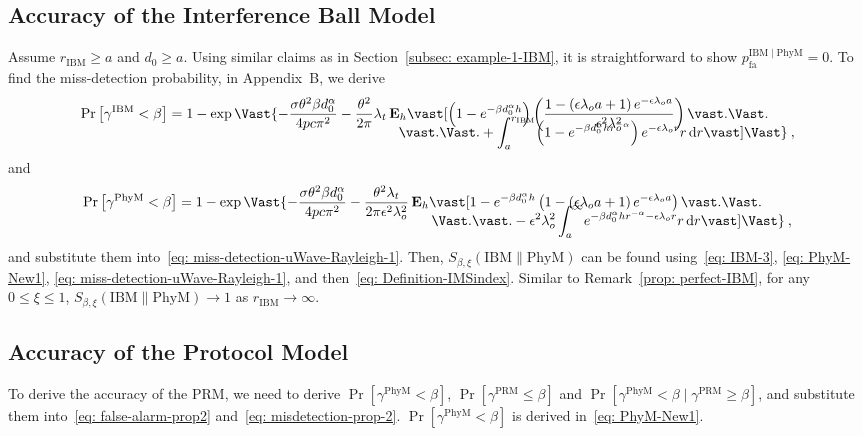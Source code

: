 \documentclass[12pt, draftclsnofoot, onecolumn]{IEEEtran}
\begin{document}
\subsection{Accuracy of the Interference Ball Model}\label{subsec: example-2-IBM}
Assume $r_{\mathrm{IBM}} \geq a$ and $d_0 \geq a$.
Using similar claims as in Section~\ref{subsec: example-1-IBM}, it is straightforward to show $p_{\mathrm{fa}}^{{\mathrm{IBM}} \mid {\mathrm{PhyM}}} = 0$.
To find the miss-detection probability, in Appendix~B, we derive
\begin{align}\label{eq: IBM-3}
\Pr\left[\gamma^{\mathrm{IBM}} < \beta \right]  &= 1 - \exp\Vast\{ - \frac{\sigma \theta^2 \beta d_{0}^{\alpha}}{4 pc\pi^2} - \frac{\theta^2}{2 \pi} \lambda_t  \, \mathbf{E}_h \vast[\left( 1 - e^{- \beta d_{0}^{\alpha} h} \right) \left( \frac{1 - \left( \epsilon \lambda_o a+ 1 \right) e^{-\epsilon \lambda_o a}}{\epsilon^2 \lambda_{o}^{2}}\right) \vast. \Vast. \nonumber \\[-5mm]
& \hspace{58mm} \vast. \Vast. + \int_{a}^{r_{\mathrm{IBM}}} \! \left( 1 - e^{- \beta d_{0}^{\alpha} h r^{-\alpha}} \right) e^{-\epsilon\lambda_o r} r \, \mathrm{d}r \vast] \Vast\} \:,
\end{align}
and
\begin{align}\label{eq: PhyM-New1}
\Pr \left[\gamma^{\mathrm{PhyM}} < \beta \right] &= 1 - \exp\Vast\{ - \frac{\sigma \theta^2 \beta d_{0}^{\alpha}}{4 pc\pi^2} - \frac{\theta^2 \lambda_t}{2 \pi \epsilon^2 \lambda_{o}^{2}} \, \mathbf{E}_h \vast[ 1 - e^{- \beta d_{0}^{\alpha} h} \left( 1 - \left( \epsilon \lambda_o a+ 1 \right) e^{-\epsilon \lambda_o a}\right) \vast. \Vast. \nonumber \\[-5mm]
& \hspace{64mm} \Vast. \vast. - \epsilon^2 \lambda_{o}^{2} \int_{a}^{\infty} \! e^{- \beta d_{0}^{\alpha} h r^{-\alpha} -\epsilon\lambda_o r} r \, \mathrm{d}r \vast] \Vast\}  \:,
\end{align}
and substitute them into~\eqref{eq: miss-detection-uWave-Rayleigh-1}. Then, $S_{\beta,\xi}\left(\mathrm{IBM}\|\mathrm{PhyM} \right)$ can be found using~\eqref{eq: IBM-3}, \eqref{eq: PhyM-New1}, \eqref{eq: miss-detection-uWave-Rayleigh-1}, and then~\eqref{eq: Definition-IMSindex}. Similar to Remark~\ref{prop: perfect-IBM}, for any $0 \leq \xi \leq 1$, $S_{\beta,\xi}\left(\mathrm{IBM}\|\mathrm{PhyM} \right) \to 1$ as $r_{\mathrm{IBM}} \to \infty$.

\subsection{Accuracy of the Protocol Model}\label{subsec: example-2-PRM}
To derive the accuracy of the PRM, we need to derive $\Pr[\gamma^{\mathrm{PhyM}} < \beta ]$, $\Pr[\gamma^{\mathrm{PRM}} \leq \beta]$ and $\Pr[\gamma^{\mathrm{PhyM}} < \beta \mid \gamma^{\mathrm{PRM}} \geq \beta]$, and substitute them into~\eqref{eq: false-alarm-prop2} and~\eqref{eq: misdetection-prop-2}. $\Pr[\gamma^{\mathrm{PhyM}} < \beta ]$ is derived in~\eqref{eq: PhyM-New1}.
\end{document}
